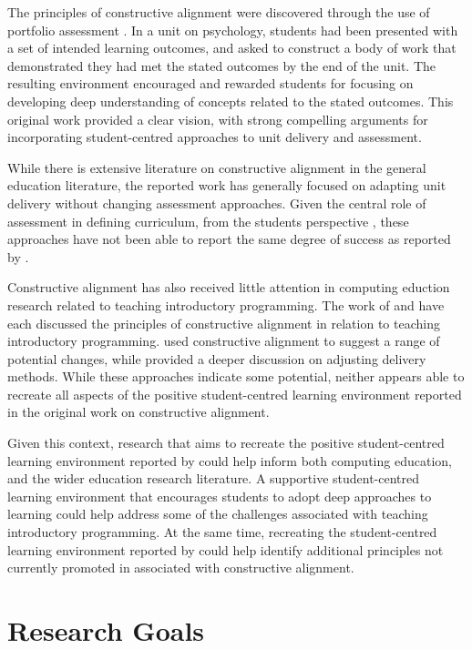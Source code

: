 The principles of constructive alignment were discovered through the use of portfolio assessment \cite{Biggs:1996c}. In a unit on psychology, students had been presented with a set of intended learning outcomes, and asked to construct a body of work that demonstrated they had met the stated outcomes by the end of the unit. The resulting environment encouraged and rewarded students for focusing on developing deep understanding of concepts related to the stated outcomes. This original work provided a clear vision, with strong compelling arguments for incorporating student-centred approaches to unit delivery and assessment.

While there is extensive literature on constructive alignment in the general education literature, the reported work has generally focused on adapting unit delivery without changing assessment approaches. Given the central role of assessment in defining curriculum, from the students perspective \cite{Ramsden:1992}, these approaches have not been able to report the same degree of success as reported by \citet{Biggs:1996c}.   

Constructive alignment has also received little attention in computing eduction research related to teaching introductory programming. The work of \citet{Thota:2010} and \citet{Gaspar:2012} have each discussed the principles of constructive alignment in relation to teaching introductory programming. \citet{Gaspar:2012} used constructive alignment to suggest a range of potential changes, while \citet{Thota:2010} provided a deeper discussion on adjusting delivery methods. While these approaches indicate some potential, neither appears able to recreate all aspects of the positive student-centred learning environment reported in the original work on constructive alignment.

Given this context, research that aims to recreate the positive student-centred learning environment reported by \citet{Biggs:1996c} could help inform both computing education, and the wider education research literature. A supportive student-centred learning environment that encourages students to adopt deep approaches to learning could help address some of the challenges associated with teaching introductory programming. At the same time, recreating the student-centred learning environment reported by \citet{Biggs:1996c} could help identify additional principles not currently promoted in associated with constructive alignment.

\section{Research Goals} %
\label{sec:research_goals}


